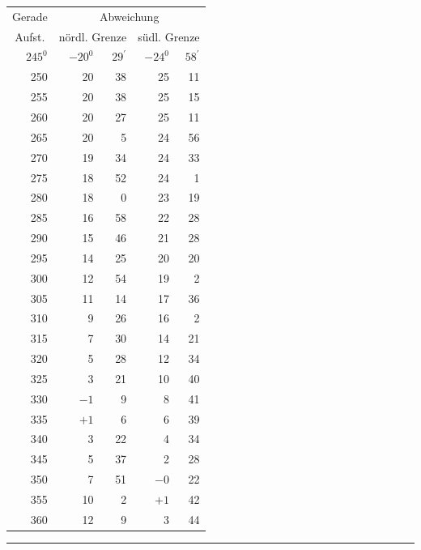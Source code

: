 \begin{center}
\begin{tabular}{|r|r@{\;}r|r@{\;}r|}
\multicolumn{1}{|c|}{Gerade}&\multicolumn{4}{c|}{Abweichung}\\
\multicolumn{1}{|c|}{Aufst.}&\multicolumn{2}{c|}{nördl. Grenze}&\multicolumn{2}{c|}{südl. Grenze}\\
\(245^{0}\)&\(-20^{0}\)&\(29^{\prime}\)&\(-24^{0}\)&\(58^{\prime}\)\\
250&20&38&25&11\\
255&20&38&25&15\\
260&20&27&25&11\\
265&20&5&24&56\\
270&19&34&24&33\\
275&18&52&24&1\\
280&18&0&23&19\\
285&16&58&22&28\\
290&15&46&21&28\\
295&14&25&20&20\\
300&12&54&19&2\\
305&11&14&17&36\\
310&9&26&16&2\\
315&7&30&14&21\\
320&5&28&12&34\\
325&3&21&10&40\\
330&\(-1\)&9&8&41\\
335&\(+1\)&6&6&39\\
340&3&22&4&34\\
345&5&37&2&28\\
350&7&51&\(-0\)&22\\
355&10&2&\(+1\)&42\\
360&12&9&3&44\\\hline
\end{tabular}
\end{center}
\endgroup
\par\medskip\begin{center}\rule{.22\textwidth}{.3pt}\end{center}
